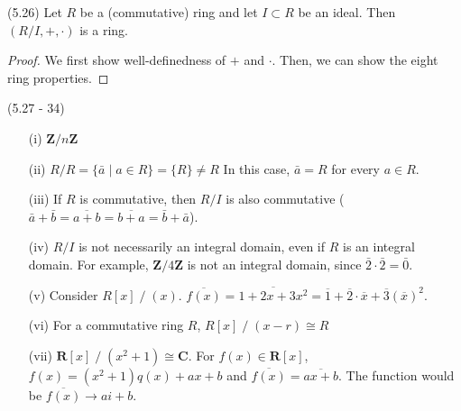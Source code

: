\vspace{2ex}
\begin{thm}
(5.26) Let $R$ be a (commutative) ring and let $I\subset R$ be an ideal. Then $(R/I,+,\cdot )$ is a ring.
\end{thm}
\vspace{2ex}
\begin{proof}
We first show well-definedness of $+$ and $\cdot $. Then, we can show the eight ring properties.
\end{proof}
\vspace{2ex}
\begin{ex}
(5.27 - 34)
\begin{itemize}
\item[(i)] ${\bm Z}/n{\bm Z}$
\item[(ii)] $R/R=\{\bar{a} \;|\; a\in R\}=\{R\}\ne R$
In this case, $\bar{a}=R$ for every $a\in R$. 
\item[(iii)] If $R$ is commutative, then $R/I$ is also commutative ($\bar{a}+\bar{b}=\overline{a+b}=\overline{b+a}=\bar{b}+\bar{a}$).
\item[(iv)] $R/I$ is not necessarily an integral domain, even if $R$ is an integral domain. For example, ${\bm Z}/4{\bm Z}$ is not an integral domain, since $\bar{2}\cdot \bar{2}=\bar{0}$.
\item[(v)] Consider $R[x]\;/\;(x)$. $\overline{f(x)}=\overline{1+2x+3x^2}=\overline{1}+\overline{2}\cdot \overline{x}+\overline{3}(\overline{x})^2$.
\item[(vi)] For a commutative ring $R$, $R[x]\;/\;(x-r)\cong R$ 
\item[(vii)] ${\bm R}[x]\;/\;(x^2+1)\cong {\bm C}$. For $f(x)\in {\bm R}[x]$, $f(x)=(x^2+1)q(x)+ax+b$ and $\overline{f(x)}=\overline{ax+b}$. The function would be $\overline{f(x)}\rightarrow ai+b$.
\end{itemize}
\end{ex}
\vspace{2ex}

